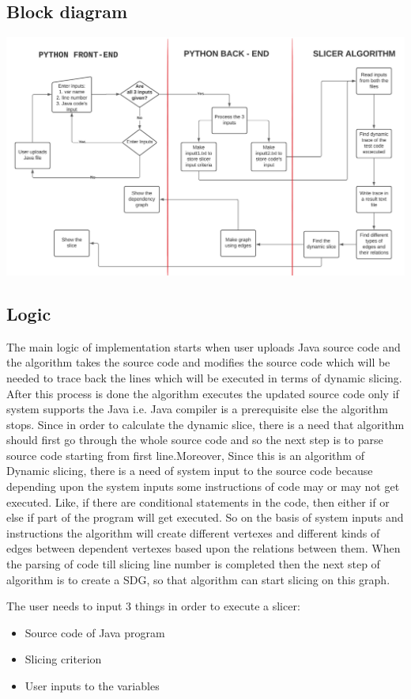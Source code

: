 \documentclass[conference]{IEEEtran}
\begin{document}
\subsection{Block diagram}
\includegraphics[scale=0.3]{Blockkk.jpeg}
\subsection{Logic}
The main logic of implementation starts when user uploads Java source code and the algorithm takes the source code and modifies the source code which will be needed to trace back the lines which will be executed in terms of dynamic slicing. After this process is done the algorithm executes the updated source code only if system supports the Java i.e. Java compiler is a prerequisite else the algorithm stops. Since in order to calculate the dynamic slice, there is a need that algorithm should first go through the whole source code and so the next step is to parse source code starting from first line.Moreover, Since this is an algorithm of Dynamic slicing, there is a need of system input to the source code because depending upon the system inputs some instructions of code may or may not get executed. Like, if there are conditional statements in the code, then either if or else if part of the program will get executed. So on the basis of system inputs and instructions the algorithm will create different vertexes and different kinds of edges between dependent vertexes based upon the relations between them. When the parsing of code till slicing line number is completed then the next step of algorithm is to create a SDG, so that algorithm can start slicing on this graph.

The user needs to input 3 things in order to execute a slicer:
\begin{itemize}
    \item Source code of Java program
    \item Slicing criterion 
    \item User inputs to the variables
\end{itemize}
\end{document}
